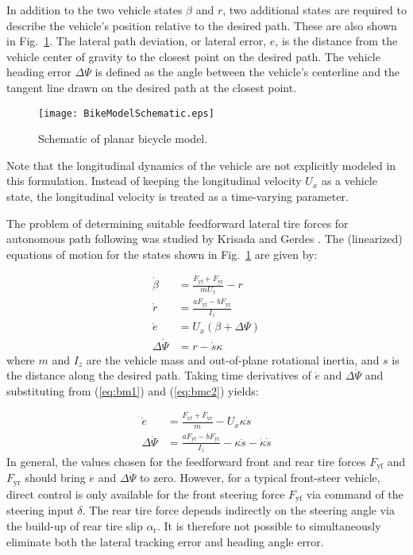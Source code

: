  In addition to the two vehicle states $\beta$ and $r$, two additional states are required to describe the vehicle's
 position relative to the desired path. These are also shown in Fig.~\ref{fig:bikeModel}. The lateral path deviation,
 or lateral error, $e$, is the distance from the vehicle center of gravity to the closest point on the desired path. 
 The vehicle heading error $\Delta\Psi$ is defined as the angle between the vehicle's centerline and the tangent line
 drawn on the desired path at the closest point. 
\begin{figure}[h]
\centering
\texttt{[image: BikeModelSchematic.eps]}
\caption[Schematic of planar bicycle model]{Schematic of planar bicycle model.}
\label{fig:bikeModel}
\end{figure}
Note that the longitudinal dynamics of the vehicle are not explicitly
 modeled in this formulation. Instead of keeping the longitudinal velocity $U_x$ as a vehicle state, the longitudinal
 velocity is treated as a time-varying parameter. 

The problem of determining suitable feedforward lateral tire forces for autonomous path following was studied by Krisada and Gerdes \cite{mickcop}. The (linearized) equations of 
motion for the states shown in Fig.~\ref{fig:bikeModel} are given by:

\begin{subequations}
\label{eq:bm}
\begin{align}
	\dot{\beta} &= \frac{F_\mathrm{yf}+F_\mathrm{yr}}{mU_x} - r \label{eq:bm1}\\
	\dot{r} &= \frac{aF_\mathrm{yf} - bF_\mathrm{yr}}{I_z} \label{eq:bmc2} \\
	\dot{e} &= U_x (\beta + \Delta\Psi) \label{eq:bm3} \\
	\Delta\dot{\Psi} &= r - \dot{s}\kappa \label{eq:bm4} 
\end{align}
\end{subequations}
where $m$ and $I_z$ are the vehicle mass and out-of-plane rotational inertia, and $s$ is the distance along the desired path. Taking time derivatives of $\dot{e}$ and $\Delta\dot{\Psi}$ and substituting from (\ref{eq:bm1}) and (\ref{eq:bmc2}) yields:

\begin{subequations}
\label{eqn:doubleds}
\begin{align}
	\ddot{e} &= \frac{F_\mathrm{yf}+F_\mathrm{yr}}{m} - U_x\kappa\dot{s} \\
	\Delta\ddot{\Psi} &= \frac{aF_\mathrm{yf} - bF_\mathrm{yr}}{I_z} -\kappa\ddot{s} - \dot{\kappa}\dot{s}
\end{align}
\end{subequations}
In general, the values chosen for the feedforward front and rear tire forces $F_\mathrm{yf}$ and $F_\mathrm{yr}$ should
bring $\ddot{e}$ and $\Delta\ddot{\Psi}$ to zero. However, for a typical front-steer vehicle, 
direct control is only available for the front steering force $F_\mathrm{yf}$ via command of the steering input $\delta$. The rear tire
force depends indirectly on the steering angle via the build-up of rear tire slip $\alpha_\mathrm{r}$. It is therefore
not possible to simultaneously eliminate both the lateral tracking error and heading angle error. 

